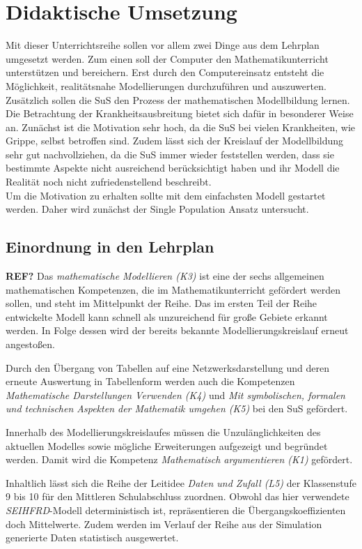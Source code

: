 \section{Didaktische Umsetzung}
\ellen
Mit dieser Unterrichtsreihe sollen vor allem zwei Dinge aus dem Lehrplan umgesetzt werden. Zum einen soll der Computer den Mathematikunterricht unterstützen und bereichern. Erst durch den Computereinsatz entsteht die Möglichkeit, realitätsnahe Modellierungen durchzuführen und auszuwerten. \\
Zusätzlich sollen die SuS den Prozess der mathematischen Modellbildung lernen. Die Betrachtung der Krankheitsausbreitung bietet sich dafür in besonderer Weise an. Zunächst ist die Motivation sehr hoch, da die SuS bei vielen Krankheiten, wie Grippe, selbst betroffen sind. Zudem lässt sich der Kreislauf der Modellbildung sehr gut nachvollziehen, da die SuS immer wieder feststellen werden, dass sie bestimmte Aspekte nicht ausreichend berücksichtigt haben und ihr Modell die Realität noch nicht zufriedenstellend beschreibt.\\
Um die Motivation zu erhalten sollte mit dem einfachsten Modell gestartet werden. Daher wird zunächst der Single Population Ansatz untersucht.
\subsection{Einordnung in den Lehrplan}
\steffen
\textbf{REF?}
Das \emph{mathematische Modellieren (K3)} ist eine der sechs allgemeinen mathematischen Kompetenzen, die im Mathematikunterricht gefördert werden sollen, und steht im Mittelpunkt der Reihe. Das im ersten Teil der Reihe entwickelte Modell kann schnell als unzureichend für große Gebiete erkannt werden. In Folge dessen wird der bereits bekannte Modellierungskreislauf erneut angestoßen. 

Durch den Übergang von Tabellen auf eine Netzwerksdarstellung und deren erneute Auswertung in Tabellenform werden auch die Kompetenzen \emph{Mathematische Darstellungen Verwenden (K4)} und \emph{Mit symbolischen, formalen und technischen Aspekten der Mathematik umgehen (K5)} bei den SuS gefördert. 

Innerhalb des Modellierungskreislaufes müssen die Unzulänglichkeiten des aktuellen Modelles sowie mögliche Erweiterungen aufgezeigt und begründet werden. Damit wird die Kompetenz \emph{Mathematisch argumentieren (K1)} gefördert.

Inhaltlich lässt sich die Reihe der Leitidee \emph{Daten und Zufall (L5)} der Klassenstufe 9 bis 10 für den Mittleren Schulabschluss zuordnen. Obwohl das hier verwendete \emph{SEIHFRD}-Modell deterministisch ist, repräsentieren die Übergangskoeffizienten doch Mittelwerte. Zudem werden im Verlauf der Reihe aus der Simulation generierte Daten statistisch ausgewertet. 


